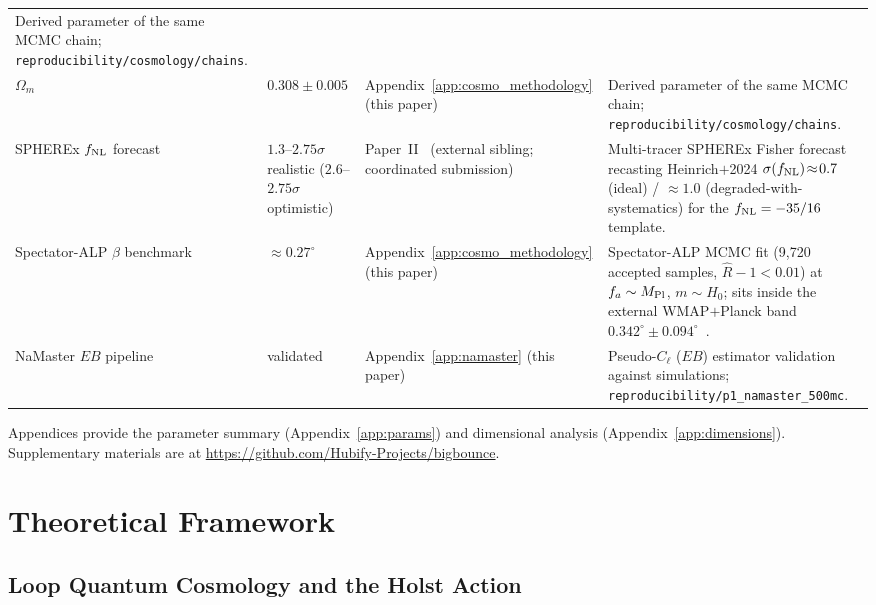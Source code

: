 \documentclass[aps,prd,twocolumn,superscriptaddress,showpacs,preprintnumbers,nofootinbib,longbibliography,floatfix]{revtex4-2}
\newcommand{\MPl}{M_{\rm Pl}}
\newcommand{\fnl}{f_{\rm NL}}
\begin{document}
\begin{table}[tb]
\begin{ruledtabular}
\begin{tabular}{llll}
\parbox[t]{0.34\textwidth}{\raggedright Derived parameter of the same MCMC
chain; \texttt{reproducibility/cosmology/chains}.\strut} \\[3pt]
$\Omega_m$ & $0.308\pm 0.005$ & Appendix~\ref{app:cosmo_methodology} (this paper) &
\parbox[t]{0.34\textwidth}{\raggedright Derived parameter of the same MCMC
chain; \texttt{reproducibility/cosmology/chains}.\strut} \\[3pt]
SPHEREx $\fnl$ forecast & \parbox[t]{0.15\textwidth}{\raggedright $1.3$--$2.75\sigma$
realistic ($2.6$--$2.75\sigma$ optimistic)\strut} &
\parbox[t]{0.20\textwidth}{\raggedright Paper~II~\cite{Golden2026P2} (external
sibling; coordinated submission)\strut} &
\parbox[t]{0.34\textwidth}{\raggedright Multi-tracer SPHEREx Fisher forecast
recasting Heinrich$+$2024 $\sigma(\fnl)\!\approx\!0.7$ (ideal) /
$\approx\!1.0$ (degraded-with-systematics) for the $\fnl=-35/16$ template.\strut} \\[3pt]
Spectator-ALP $\beta$ benchmark & $\approx 0.27^\circ$ &
Appendix~\ref{app:cosmo_methodology} (this paper) &
\parbox[t]{0.34\textwidth}{\raggedright Spectator-ALP MCMC fit (9{,}720 accepted
samples, $\hat{R}-1<0.01$) at $f_a\sim\MPl$, $m\sim H_0$; sits inside the external
WMAP$+$Planck band $0.342^\circ\pm 0.094^\circ$~\cite{Eskilt2022}.\strut} \\[3pt]
NaMaster $EB$ pipeline & validated & Appendix~\ref{app:namaster} (this paper) &
\parbox[t]{0.34\textwidth}{\raggedright Pseudo-$C_\ell$ ($EB$) estimator
validation against simulations; \texttt{reproducibility/p1\_namaster\_500mc}.\strut} \\
\end{tabular}
\end{ruledtabular}
\end{table}

Appendices provide the parameter summary (Appendix~\ref{app:params}) and
dimensional analysis (Appendix~\ref{app:dimensions}).
Supplementary materials are at \url{https://github.com/Hubify-Projects/bigbounce}.


\section{Theoretical Framework}\label{sec:theory}

\subsection{Loop Quantum Cosmology and the Holst Action}\label{sec:holst}
\end{document}
